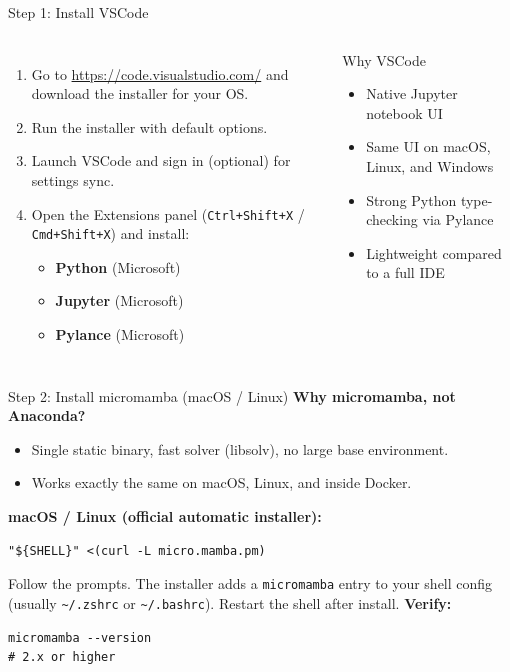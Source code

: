 \documentclass[aspectratio=169,10pt]{beamer}
\newcommand{\code}[1]{\texttt{#1}}
\begin{document}
\begin{frame}{Step 1: Install VSCode}
\begin{columns}[T]
\begin{enumerate}
  \item Go to \url{https://code.visualstudio.com/} and download the installer for your OS.
  \item Run the installer with default options.
  \item Launch VSCode and sign in (optional) for settings sync.
  \item Open the Extensions panel (\code{Ctrl+Shift+X} / \code{Cmd+Shift+X}) and install:
  \begin{itemize}
    \item \textbf{Python} (Microsoft)
    \item \textbf{Jupyter} (Microsoft)
    \item \textbf{Pylance} (Microsoft)
  \end{itemize}
\end{enumerate}
\begin{block}{Why VSCode}
\begin{itemize}
  \item Native Jupyter notebook UI
  \item Same UI on macOS, Linux, and Windows
  \item Strong Python type-checking via Pylance
  \item Lightweight compared to a full IDE
\end{itemize}
\end{block}
\end{columns}
\end{frame}

\begin{frame}[fragile]{Step 2: Install micromamba (macOS / Linux)}
\textbf{Why micromamba, not Anaconda?}
\begin{itemize}
  \item Single static binary, fast solver (libsolv), no large base environment.
  \item Works exactly the same on macOS, Linux, and inside Docker.
\end{itemize}
\vspace{0.4em}
\textbf{macOS / Linux (official automatic installer):}
\begin{lstlisting}
"${SHELL}" <(curl -L micro.mamba.pm)
\end{lstlisting}
Follow the prompts. The installer adds a \code{micromamba} entry to your shell config (usually \code{\~{}/.zshrc} or \code{\~{}/.bashrc}). Restart the shell after install.
\vspace{0.4em}
\textbf{Verify:}
\begin{lstlisting}
micromamba --version
# 2.x or higher
\end{lstlisting}
\end{frame}
\end{document}
